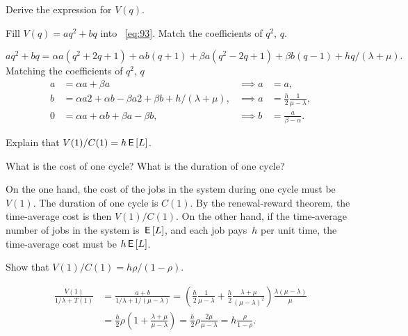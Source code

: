 \documentclass[queueing-book.tex]{subfiles}
\begin{document}
\begin{exercise}\label{ex:nmm-2}
Derive the expression for $V(q)$.
\begin{hint}
  Fill $V(q) = aq^2 + bq$ into ~\cref{eq:93}. Match the coefficients of $q^2$, $q$.
\end{hint}
\begin{solution}
  \begin{equation*}
    aq^2 + b q = \alpha a (q^2 + 2q + 1) + \alpha b (q+1) + \beta a (q^2 - 2q + 1) + \beta b (q - 1) + hq/(\lambda + \mu).
  \end{equation*}
  Matching the coefficients of $q^2$, $q$
  \begin{align*}
    a &= \alpha a + \beta a &\implies a &= a, \\
    b &= \alpha a 2 + \alpha b - \beta a 2 + \beta b + h/(\lambda + \mu), & \implies a &= \frac h 2 \frac 1 {\mu -\lambda},\\
    0 &= \alpha a + \alpha b + \beta a - \beta b, & \implies b &= \frac a {\beta - \alpha}.
  \end{align*}
\end{solution}
\end{exercise}

\begin{exercise}\label{ex:nmm5}
Explain that $V(1)/C(1) = h \,\mathsf{E}\left[L\right]$.
\begin{hint}
  What is the cost of one cycle? What is the duration of one cycle?
\end{hint}
\begin{solution}
  On the one hand, the cost of the jobs in the system during one cycle must be $V(1)$.
  The duration of one cycle is $C(1)$.
  By the renewal-reward theorem, the time-average cost is then $V(1)/C(1)$.
  On the other hand, if the time-average number of jobs in the system is $\,\mathsf{E}\left[L\right]$, and each job pays~$h$ per unit time, the time-average cost must be $h \,\mathsf{E}\left[L\right]$.
\end{solution}
\end{exercise}

\begin{exercise}\label{ex:62}
Show that $V(1)/C(1) = h \rho/(1-\rho).$
\begin{solution}
\begin{align*}
  \frac{V(1)}{1/\lambda + T(1)}
  &= \frac{a+b}{1/\lambda + 1/(\mu-\lambda)}
= \left(\frac h 2 \frac 1 {\mu -\lambda} + \frac h 2 \frac{\lambda + \mu}{(\mu - \lambda)^2}\right)\frac{\lambda(\mu-\lambda)}{\mu}\\
&=\frac{h}2 \rho \left(1 + \frac{\lambda+\mu}{\mu-\lambda}\right) = \frac{h}{2} \rho \frac{2\mu}{\mu-\lambda}  = h \frac{\rho}{1-\rho}.
\end{align*}
\end{solution}
\end{exercise}
\end{document}
